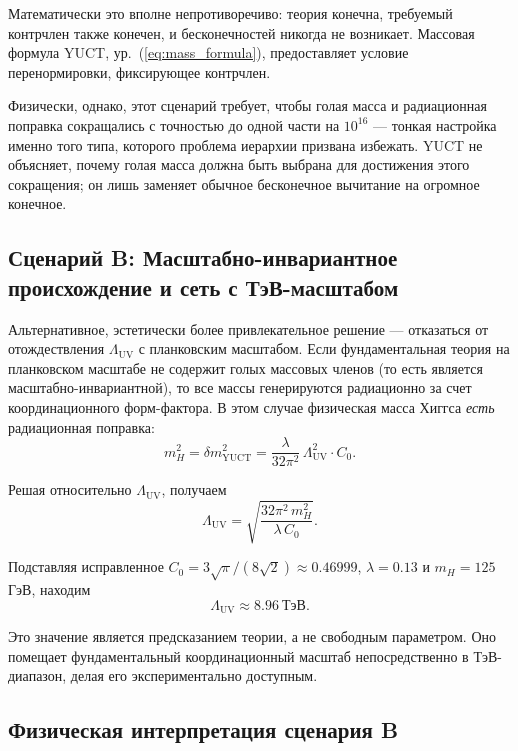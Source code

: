 \documentclass[11pt,a4paper]{article}
\newcommand{\LUV}{\Lambda_{\mathrm{UV}}}
\theoremstyle{remark}
\begin{document}
	Математически это вполне непротиворечиво: теория конечна, требуемый контрчлен также конечен, и бесконечностей никогда не возникает. Массовая формула YUCT, ур.~(\ref{eq:mass_formula}), предоставляет условие перенормировки, фиксирующее контрчлен.
	
	Физически, однако, этот сценарий требует, чтобы голая масса и радиационная поправка сокращались с точностью до одной части на \(10^{16}\) — тонкая настройка именно того типа, которого проблема иерархии призвана избежать. YUCT не объясняет, почему голая масса должна быть выбрана для достижения этого сокращения; он лишь заменяет обычное бесконечное вычитание на огромное конечное.
	
	\subsection{Сценарий B: Масштабно-инвариантное происхождение и сеть с ТэВ-масштабом}
	
	Альтернативное, эстетически более привлекательное решение — отказаться от отождествления \(\LUV\) с планковским масштабом. Если фундаментальная теория на планковском масштабе не содержит голых массовых членов (то есть является масштабно-инвариантной), то все массы генерируются радиационно за счет координационного форм-фактора. В этом случае физическая масса Хиггса \emph{есть} радиационная поправка:
	\begin{equation}
		m_H^2 = \delta m^2_{\mathrm{YUCT}} = \frac{\lambda}{32\pi^2}\,\LUV^2 \cdot C_0.
		\label{eq:scale_inv}
	\end{equation}
	
	Решая относительно \(\LUV\), получаем
	\begin{equation}
		\LUV = \sqrt{\frac{32\pi^2\, m_H^2}{\lambda\, C_0}}.
		\label{eq:LUV_solve}
	\end{equation}
	
	Подставляя исправленное \(C_0 = 3\sqrt{\pi}/(8\sqrt{2}) \approx 0.46999\), \(\lambda = 0.13\) и \(m_H = 125\) ГэВ, находим
	\begin{equation}
		\boxed{\LUV \approx 8.96\ \mathrm{ТэВ}}.
		\label{eq:LUV_TeV}
	\end{equation}
	
	Это значение является предсказанием теории, а не свободным параметром. Оно помещает фундаментальный координационный масштаб непосредственно в ТэВ-диапазон, делая его экспериментально доступным.
	
	\subsection{Физическая интерпретация сценария B}
	
\end{document}
